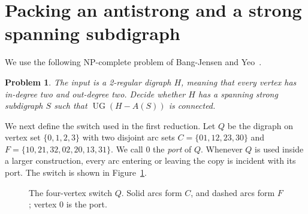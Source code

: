 \documentclass[12pt]{article}
\newtheorem{problem}[theorem]{Problem}
\theoremstyle{remark}
\newcommand{\UG}{\operatorname{UG}}
\begin{document}
\section{Packing an antistrong and a strong spanning subdigraph}\label{sec:strong}

We use the following NP-complete problem of Bang-Jensen and
Yeo~\cite[Theorem~1.6]{BY}.

\begin{problem}\label{prob:NSSS}
The input is a 2-regular digraph $H$, meaning that every vertex has
in-degree two and out-degree two.  Decide whether $H$ has a spanning
strong subdigraph $S$ such that $\UG(H-A(S))$ is connected.
\end{problem}
We next define the switch used in the first reduction.  Let $Q$ be the
digraph on vertex set $\{0,1,2,3\}$ with two disjoint arc sets $C=\{01,12,23,30\}$ and $F= \{10,21,32,02,20,13,31\}$.
We call $0$ the \emph{port} of $Q$. Whenever $Q$ is used inside a larger construction, every arc entering or leaving the copy is incident with its port. The switch is shown in
Figure~\ref{fig:switch-Q}.

\begin{figure}[htbp]
\centering
{}
\caption{The four-vertex switch $Q$.  Solid arcs form $C$, and
dashed arcs form $F$; vertex $0$ is the port.}
\label{fig:switch-Q}
\end{figure}
\end{document}
